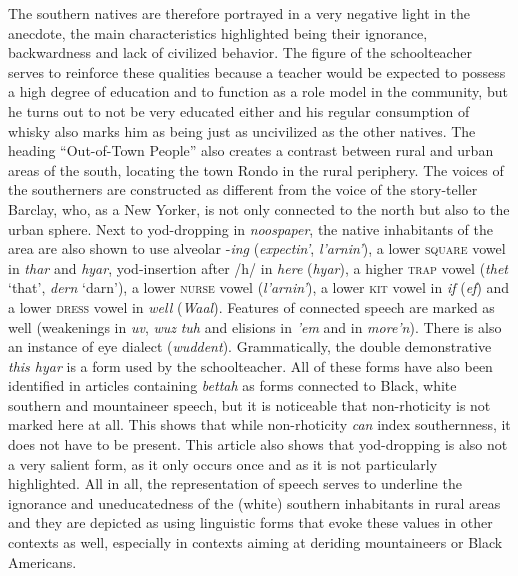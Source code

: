 The southern natives are therefore portrayed in a very negative light in the anecdote, the main characteristics highlighted being their ignorance, backwardness and lack of civilized behavior. The figure of the schoolteacher serves to reinforce these qualities because a teacher would be expected to possess a high degree of education and to function as a role model in the community, but he turns out to not be very educated either and his regular consumption of whisky also marks him as being just as uncivilized as the other natives. The heading “Out-of-Town People” also creates a contrast between rural and urban areas of the south, locating the town Rondo in the rural periphery. The voices of the southerners are constructed as different from the voice of the story-teller Barclay, who, as a New Yorker, is not only connected to the north but also to the urban sphere. Next to yod-dropping in \emph{noospaper}, the native inhabitants of the area are also shown to use alveolar -\emph{ing} (\emph{expectin’}, \emph{l’arnin’}), a lower \textsc{square} vowel in \emph{thar} and \emph{hyar}, yod-insertion after /h/ in \emph{here} (\emph{hyar}), a higher \textsc{trap} vowel (\emph{thet} ‘that’, \emph{dern} ‘darn’), a lower \textsc{nurse} vowel (\emph{l’arnin’}), a lower \textsc{kit} vowel in \emph{if} (\emph{ef}) and a lower \textsc{dress} vowel in \emph{well} (\emph{Waal}). Features of connected speech are marked as well (weakenings in \emph{uv}, \emph{wuz} \emph{tuh} and elisions in \emph{’em} and in \emph{more’n}). There is also an instance of eye dialect (\emph{wuddent}). Grammatically, the double demonstrative \emph{this hyar} is a form used by the schoolteacher. All of these forms have also been identified in articles containing \emph{bettah} as forms connected to Black, white southern and mountaineer speech, but it is noticeable that non-rhoticity is not marked here at all. This shows that while non-rhoticity \emph{can} index southernness, it does not have to be present. This article also shows that yod-dropping is also not a very salient form, as it only occurs once and as it is not particularly highlighted. All in all, the representation of speech serves to underline the ignorance and uneducatedness of the (white) southern inhabitants in rural areas and they are depicted as using linguistic forms that evoke these values in other contexts as well, especially in contexts aiming at deriding mountaineers or Black Americans.

